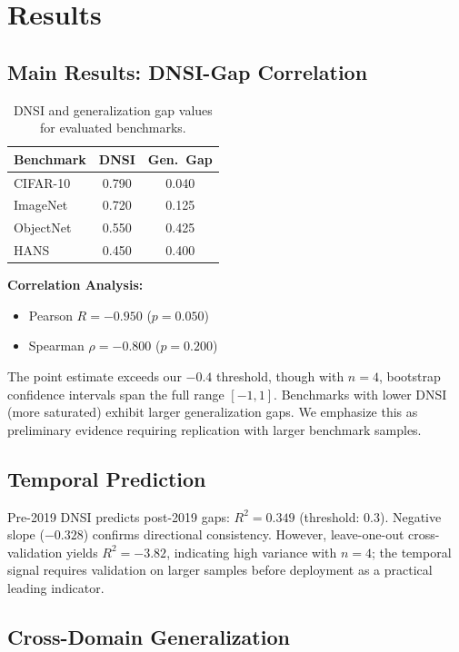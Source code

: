 \section{Results}
\label{sec:results}

\subsection{Main Results: DNSI-Gap Correlation}

\begin{table}[h]
\centering
\caption{DNSI and generalization gap values for evaluated benchmarks.}
\label{tab:main_results}
\begin{tabular}{@{}lcc@{}}
\toprule
Benchmark & DNSI & Gen.\ Gap \\
\midrule
CIFAR-10 & 0.790 & 0.040 \\
ImageNet & 0.720 & 0.125 \\
ObjectNet & 0.550 & 0.425 \\
HANS & 0.450 & 0.400 \\
\bottomrule
\end{tabular}
\end{table}

\textbf{Correlation Analysis:}
\begin{itemize}
    \item Pearson $R = \mathbf{-0.950}$ ($p = 0.050$)
    \item Spearman $\rho = \mathbf{-0.800}$ ($p = 0.200$)
\end{itemize}

The point estimate exceeds our $-0.4$ threshold, though with $n=4$, bootstrap confidence intervals span the full range $[-1, 1]$. Benchmarks with lower DNSI (more saturated) exhibit larger generalization gaps. We emphasize this as preliminary evidence requiring replication with larger benchmark samples.

\subsection{Temporal Prediction}

Pre-2019 DNSI predicts post-2019 gaps: $R^2 = \mathbf{0.349}$ (threshold: 0.3). Negative slope ($-0.328$) confirms directional consistency. However, leave-one-out cross-validation yields $R^2 = -3.82$, indicating high variance with $n=4$; the temporal signal requires validation on larger samples before deployment as a practical leading indicator.

\subsection{Cross-Domain Generalization}

